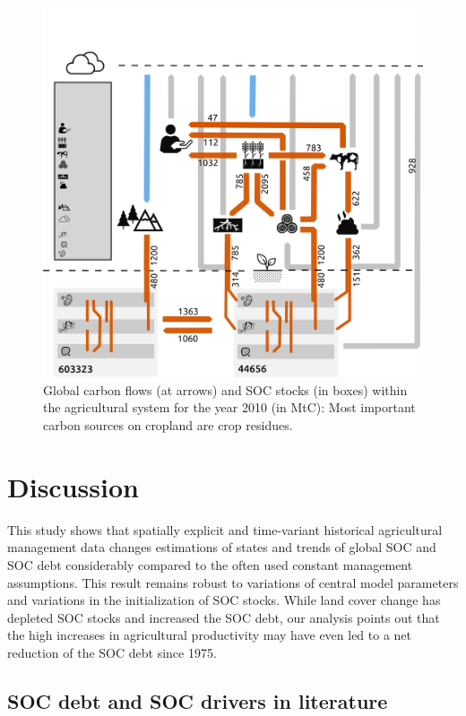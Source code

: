 \documentclass[gc, manuscript]{copernicus}
\begin{document}
\begin{figure}
\includegraphics[width=16cm]{../ResultNotebooks/Output/Images/CarbonBudget} \caption{Global carbon flows (at arrows) and SOC stocks (in boxes) within the agricultural system for the year 2010 (in MtC): Most important carbon sources on cropland are crop residues.}\label{fig:FlowFig}
\end{figure}

\newpage

\hypertarget{discussion}{%
\section{Discussion}\label{discussion}}

This study shows that spatially explicit and time-variant historical agricultural management data changes estimations of states and trends of global SOC and SOC debt considerably compared to the often used constant management assumptions. This result remains robust to variations of central model parameters and variations in the initialization of SOC stocks. While land cover change has depleted SOC stocks and increased the SOC debt, our analysis points out that the high increases in agricultural productivity may have even led to a net reduction of the SOC debt since 1975.

\hypertarget{soc-debt-and-soc-drivers-in-literature}{%
\subsection{SOC debt and SOC drivers in literature}\label{soc-debt-and-soc-drivers-in-literature}}
\end{document}
